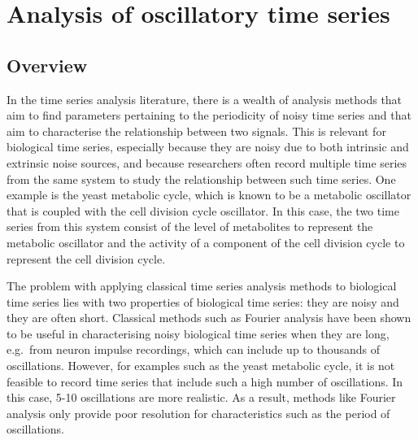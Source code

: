 
\chapter{Analysis of oscillatory time series}
\label{ch:analysis}

\section{Overview}
\label{sec:analysis-overview}


In the time series analysis literature, there is a wealth of analysis methods that aim to find parameters pertaining to the periodicity of noisy time series and that aim to characterise the relationship between two signals.
This is relevant for biological time series, especially because they are noisy due to both intrinsic and extrinsic noise sources, and because researchers often record multiple time series from the same system to study the relationship between such time series.
One example is the yeast metabolic cycle, which is known to be a metabolic oscillator that is coupled with the cell division cycle oscillator.
In this case, the two time series from this system consist of the level of metabolites to represent the metabolic oscillator and the activity of a component of the cell division cycle to represent the cell division cycle.

The problem with applying classical time series analysis methods to biological time series lies with two properties of biological time series: they are noisy and they are often short.
Classical methods such as Fourier analysis have been shown to be useful in characterising noisy biological time series when they are long, e.g.\ from neuron impulse recordings, which can include up to thousands of oscillations.
However, for examples such as the yeast metabolic cycle, it is not feasible to record time series that include such a high number of oscillations.
In this case, 5-10 oscillations are more realistic.
As a result, methods like Fourier analysis only provide poor resolution for characteristics such as the period of oscillations.

